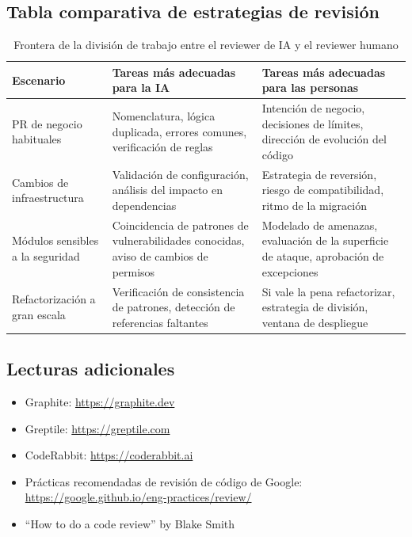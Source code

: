 \subsection{Tabla comparativa de estrategias de revisión}

\begin{table}[H]
\centering
\begin{tabular}{p{} p{} p{}}
\toprule
Escenario & Tareas más adecuadas para la IA & Tareas más adecuadas para las personas \\
\midrule
PR de negocio habituales & Nomenclatura, lógica duplicada, errores comunes, verificación de reglas & Intención de negocio, decisiones de límites, dirección de evolución del código \\
Cambios de infraestructura & Validación de configuración, análisis del impacto en dependencias & Estrategia de reversión, riesgo de compatibilidad, ritmo de la migración \\
Módulos sensibles a la seguridad & Coincidencia de patrones de vulnerabilidades conocidas, aviso de cambios de permisos & Modelado de amenazas, evaluación de la superficie de ataque, aprobación de excepciones \\
Refactorización a gran escala & Verificación de consistencia de patrones, detección de referencias faltantes & Si vale la pena refactorizar, estrategia de división, ventana de despliegue \\
\bottomrule
\end{tabular}
\caption{Frontera de la división de trabajo entre el reviewer de IA y el reviewer humano}
\end{table}

\subsection{Lecturas adicionales}

\begin{itemize}
    \item Graphite: \url{https://graphite.dev}
    \item Greptile: \url{https://greptile.com}
    \item CodeRabbit: \url{https://coderabbit.ai}
    \item Prácticas recomendadas de revisión de código de Google: \url{https://google.github.io/eng-practices/review/}
    \item ``How to do a code review'' by Blake Smith
\end{itemize}



